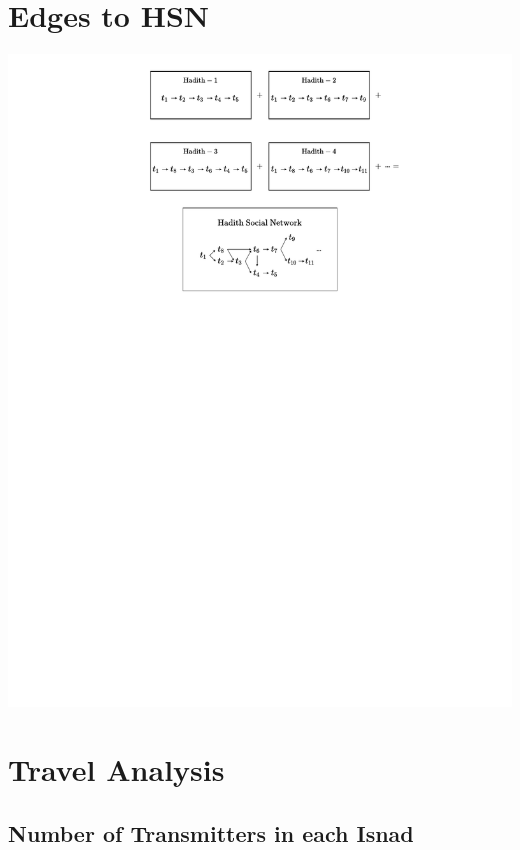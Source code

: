 \documentclass[12pt,english]{article}
\begin{document}
\section{Edges to HSN}
\vspace*{-0.4cm}
\hspace*{-2cm}
\includegraphics[scale=0.9]{edges-to-hsn/b1_edges_to_hsn.pdf}

\newpage
\section{Travel Analysis}
\subsection{Number of Transmitters in each Isnad}
\end{document}
